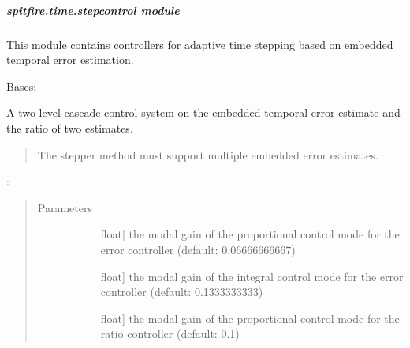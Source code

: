 \documentclass[letterpaper,10pt,english]{sphinxmanual}
\begin{document}
\subparagraph{spitfire.time.stepcontrol module}
\label{\detokenize{spitfire.time.stepcontrol:module-spitfire.time.stepcontrol}}\label{\detokenize{spitfire.time.stepcontrol:spitfire-time-stepcontrol-module}}\label{\detokenize{spitfire.time.stepcontrol::doc}}
This module contains controllers for adaptive time stepping based on embedded temporal error estimation.

\begin{fulllineitems}
\label{\detokenize{spitfire.time.stepcontrol:spitfire.time.stepcontrol.CascadeController}}
Bases: 

A two-level cascade control system on the embedded temporal error estimate and the ratio of two estimates.
\begin{quote}

The stepper method must support multiple embedded error estimates.
\end{quote}

:
\begin{quote}\begin{description}
\item[{Parameters}] \leavevmode\begin{description}
\item[{}] \leavevmode{[}float{]}
the modal gain of the proportional control mode for the error controller (default: 0.06666666667)

\item[{}] \leavevmode{[}float{]}
the modal gain of the integral control mode for the error controller (default: 0.1333333333)

\item[{}] \leavevmode{[}float{]}
the modal gain of the proportional control mode for the ratio controller (default: 0.1)


\end{description}
\end{description}
\end{quote}
\end{fulllineitems}
\end{document}
